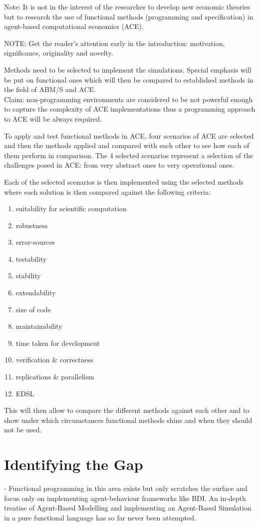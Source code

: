 Note: It is not in the interest of the researcher to develop new economic theories but to research the use of functional methods (programming and specification) in agent-based computational economics (ACE).

NOTE: Get the reader’s attention early in the introduction: motivation, significance, originality and novelty.

Methods need to be selected to implement the simulations. Special emphasis will be put on functional ones which will then be compared to established methods in the field of ABM/S and ACE. \\

Claim: non-programming environments are considered to be not powerful enough to capture the complexity of ACE implementations thus a programming approach to ACE will be always required.


To apply and test functional methods in ACE, four scenarios of ACE are selected and then the methods applied and compared with each other to see how each of them perform in comparison. The 4 selected scenarios represent a selection of the challenges posed in ACE: from very abstract ones to very operational ones.

Each of the selected scenarios is then implemented using the selected methods where each solution is then compared against the following criteria: 

\begin{enumerate}
\item suitability for scientific computation
\item robustness
\item error-sources
\item testability
\item stability
\item extendability
\item size of code
\item maintainability
\item time taken for development
\item verification \& correctness
\item replications \& parallelism
\item EDSL
\end{enumerate}

This will then allow to compare the different methods against each other and to show under which circumstances functional methods shine and when they should not be used.

\section{Identifying the Gap}
- Functional programming in this area exists but only scratches the surface and focus only on implementing agent-behaviour frameworks like BDI. An in-depth treatise of Agent-Based Modelling and implementing an Agent-Based Simulation in a pure functional language has so far never been attempted.

